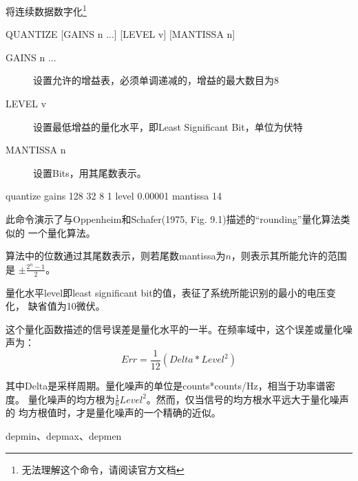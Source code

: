 \label{cmd:quantize}

将连续数据数字化\footnote{无法理解这个命令，请阅读官方文档}

\begin{SACSTX}
QUANTIZE [GAINS n ...] [LEVEL v] [MANTISSA n]
\end{SACSTX}

\begin{description}
\item [GAINS n ...] 设置允许的增益表，必须单调递减的，增益的最大数目为8 
\item [LEVEL v] 设置最低增益的量化水平，即Least Significant Bit，单位为伏特 
\item [MANTISSA n] 设置Bits，用其尾数表示。
\end{description}

\begin{SACDFT}
quantize gains 128 32 8 1 level 0.00001 mantissa 14
\end{SACDFT}

此命令演示了与Oppenheim和Schafer(1975, Fig. 9.1)描述的``rounding''量化算法类似的
一个量化算法。

算法中的位数通过其尾数表示，则若尾数mantissa为$n$，则表示其所能允许的范围是
$\pm \frac{2^n-1}{2}$。

量化水平level即least significant bit的值，表征了系统所能识别的最小的电压变化，
缺省值为10微伏。

这个量化函数描述的信号误差是量化水平的一半。在频率域中，这个误差或量化噪声为：
\[
    Err = \frac{1}{12}(Delta*Level^2)
\]

其中Delta是采样周期。量化噪声的单位是counts*counts/Hz，相当于功率谱密度。
量化噪声的均方根为$\frac{1}{6}Level^2$。然而，仅当信号的均方根水平远大于量化噪声的
均方根值时，才是量化噪声的一个精确的近似。

depmin、depmax、depmen
